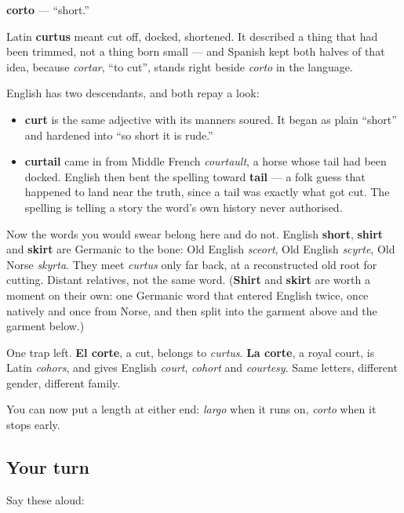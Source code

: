 \begin{cousinweb}
\textbf{corto} — \textquotedblleft{}short.\textquotedblright{}

Latin \textbf{curtus} meant cut off, docked, shortened. It described a thing that had been trimmed, not a thing born small — and Spanish kept both halves of that idea, because \emph{cortar}, \textquotedblleft{}to cut\textquotedblright{}, stands right beside \emph{corto} in the language.

English has two descendants, and both repay a look:

\begin{itemize}
\raggedright
  \item \textbf{curt} is the same adjective with its manners soured. It began as plain \textquotedblleft{}short\textquotedblright{} and hardened into \textquotedblleft{}so short it is rude.\textquotedblright{}
  \item \textbf{curtail} came in from Middle French \emph{courtault}, a horse whose tail had been docked. English then bent the spelling toward \textbf{tail} — a folk guess that happened to land near the truth, since a tail was exactly what got cut. The spelling is telling a story the word's own history never authorised.
\end{itemize}

Now the words you would swear belong here and do not. English \textbf{short}, \textbf{shirt} and \textbf{skirt} are Germanic to the bone: Old English \emph{sceort}, Old English \emph{scyrte}, Old Norse \emph{skyrta}. They meet \emph{curtus} only far back, at a reconstructed old root for cutting. Distant relatives, not the same word. (\textbf{Shirt} and \textbf{skirt} are worth a moment on their own: one Germanic word that entered English twice, once natively and once from Norse, and then split into the garment above and the garment below.)

One trap left. \textbf{El corte}, a cut, belongs to \emph{curtus}. \textbf{La corte}, a royal court, is Latin \emph{cohors}, and gives English \emph{court}, \emph{cohort} and \emph{courtesy}. Same letters, different gender, different family.
\end{cousinweb}

\begin{grammarlens}[title={What you've built}]
You can now put a length at either end: \emph{largo} when it runs on, \emph{corto} when it stops early.
\end{grammarlens}

\subsection*{Your turn}
Say these aloud:

